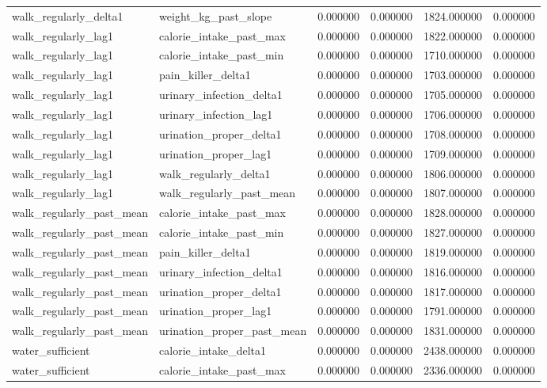 \begin{longtable}{llrrrr}
walk\_regularly\_delta1 & weight\_kg\_past\_slope & 0.000000 & 0.000000 & 1824.000000 & 0.000000 \\
walk\_regularly\_lag1 & calorie\_intake\_past\_max & 0.000000 & 0.000000 & 1822.000000 & 0.000000 \\
walk\_regularly\_lag1 & calorie\_intake\_past\_min & 0.000000 & 0.000000 & 1710.000000 & 0.000000 \\
walk\_regularly\_lag1 & pain\_killer\_delta1 & 0.000000 & 0.000000 & 1703.000000 & 0.000000 \\
walk\_regularly\_lag1 & urinary\_infection\_delta1 & 0.000000 & 0.000000 & 1705.000000 & 0.000000 \\
walk\_regularly\_lag1 & urinary\_infection\_lag1 & 0.000000 & 0.000000 & 1706.000000 & 0.000000 \\
walk\_regularly\_lag1 & urination\_proper\_delta1 & 0.000000 & 0.000000 & 1708.000000 & 0.000000 \\
walk\_regularly\_lag1 & urination\_proper\_lag1 & 0.000000 & 0.000000 & 1709.000000 & 0.000000 \\
walk\_regularly\_lag1 & walk\_regularly\_delta1 & 0.000000 & 0.000000 & 1806.000000 & 0.000000 \\
walk\_regularly\_lag1 & walk\_regularly\_past\_mean & 0.000000 & 0.000000 & 1807.000000 & 0.000000 \\
walk\_regularly\_past\_mean & calorie\_intake\_past\_max & 0.000000 & 0.000000 & 1828.000000 & 0.000000 \\
walk\_regularly\_past\_mean & calorie\_intake\_past\_min & 0.000000 & 0.000000 & 1827.000000 & 0.000000 \\
walk\_regularly\_past\_mean & pain\_killer\_delta1 & 0.000000 & 0.000000 & 1819.000000 & 0.000000 \\
walk\_regularly\_past\_mean & urinary\_infection\_delta1 & 0.000000 & 0.000000 & 1816.000000 & 0.000000 \\
walk\_regularly\_past\_mean & urination\_proper\_delta1 & 0.000000 & 0.000000 & 1817.000000 & 0.000000 \\
walk\_regularly\_past\_mean & urination\_proper\_lag1 & 0.000000 & 0.000000 & 1791.000000 & 0.000000 \\
walk\_regularly\_past\_mean & urination\_proper\_past\_mean & 0.000000 & 0.000000 & 1831.000000 & 0.000000 \\
water\_sufficient & calorie\_intake\_delta1 & 0.000000 & 0.000000 & 2438.000000 & 0.000000 \\
water\_sufficient & calorie\_intake\_past\_max & 0.000000 & 0.000000 & 2336.000000 & 0.000000 \\

\end{longtable}
